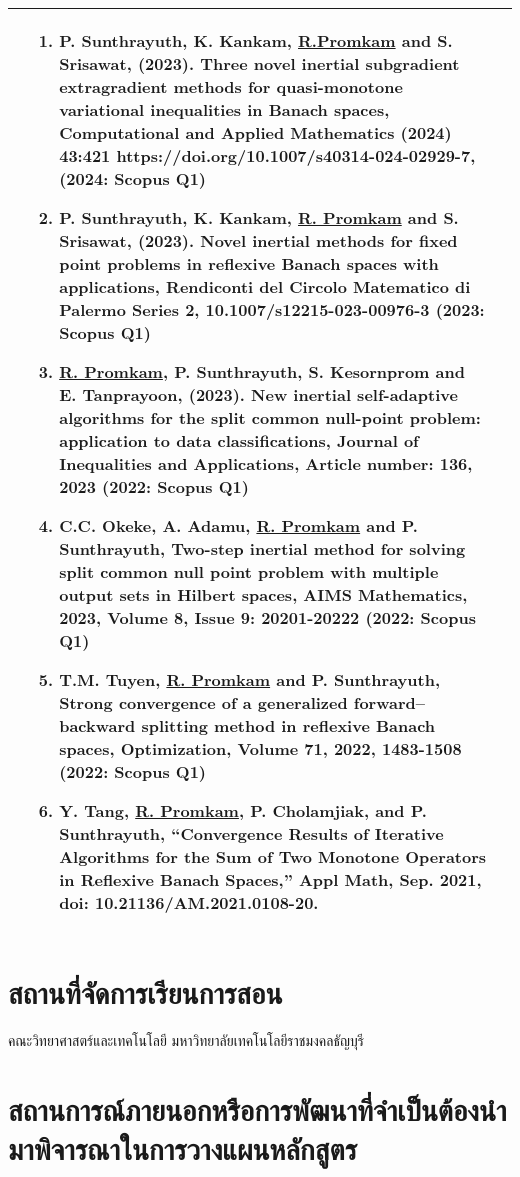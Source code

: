 {\begin{center}
\begin{longtable}{|p{}|p{}|p{}|}
& 
\begin{enumerate}[series=dear]
	\item P. Sunthrayuth, K. Kankam,  \underline{R.Promkam} and S. Srisawat, (2023). Three novel inertial subgradient extragradient methods for quasi-monotone variational inequalities in Banach spaces, Computational and Applied Mathematics (2024) 43:421 https://doi.org/10.1007/s40314-024-02929-7, (2024: Scopus Q1)
	\item P. Sunthrayuth, K. Kankam, \underline{R. Promkam} and S. Srisawat, (2023). Novel inertial methods for fixed point problems in reflexive Banach spaces with applications, Rendiconti del Circolo Matematico di Palermo Series 2, 10.1007/s12215-023-00976-3 (2023: Scopus Q1)
	\item \underline{R. Promkam}, P. Sunthrayuth, S. Kesornprom and E. Tanprayoon, (2023). New inertial self-adaptive algorithms for the split common null-point problem: application to data classifications, Journal of Inequalities and Applications, Article number: 136, 2023 (2022: Scopus Q1)
	\item C.C. Okeke, A. Adamu, \underline{R. Promkam} and P. Sunthrayuth, Two-step inertial method for solving split common null point problem with multiple output sets in Hilbert spaces, AIMS Mathematics, 2023, Volume 8, Issue 9: 20201-20222 (2022: Scopus Q1)
	\item T.M. Tuyen, \underline{R. Promkam} and P. Sunthrayuth, Strong convergence of a generalized forward–backward splitting method in reflexive Banach spaces, Optimization, Volume 71, 2022, 1483-1508 (2022: Scopus Q1)
	\item Y. Tang, \underline{R. Promkam}, P. Cholamjiak, and P. Sunthrayuth, “Convergence Results of Iterative Algorithms for the Sum of Two Monotone Operators in Reflexive Banach Spaces,” Appl Math, Sep. 2021, doi: 10.21136/AM.2021.0108-20.
\end{enumerate}
 \\ \hline

\end{longtable}
\end{center}

\section{สถานที่จัดการเรียนการสอน}
	คณะวิทยาศาสตร์และเทคโนโลยี มหาวิทยาลัยเทคโนโลยีราชมงคลธัญบุรี
\section{สถานการณ์ภายนอกหรือการพัฒนาที่จำเป็นต้องนำมาพิจารณาในการวางแผนหลักสูตร} \label{event_plan}
}
